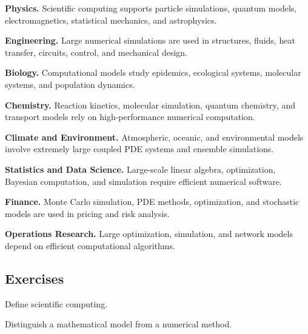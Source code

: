 \begin{applicationbox}

\textbf{Physics.}
Scientific computing supports particle simulations, quantum models,
electromagnetics, statistical mechanics, and astrophysics.

\medskip

\textbf{Engineering.}
Large numerical simulations are used in structures, fluids, heat transfer,
circuits, control, and mechanical design.

\medskip

\textbf{Biology.}
Computational models study epidemics, ecological systems, molecular
systems, and population dynamics.

\medskip

\textbf{Chemistry.}
Reaction kinetics, molecular simulation, quantum chemistry, and transport
models rely on high-performance numerical computation.

\medskip

\textbf{Climate and Environment.}
Atmospheric, oceanic, and environmental models involve extremely large
coupled PDE systems and ensemble simulations.

\medskip

\textbf{Statistics and Data Science.}
Large-scale linear algebra, optimization, Bayesian computation, and
simulation require efficient numerical software.

\medskip

\textbf{Finance.}
Monte Carlo simulation, PDE methods, optimization, and stochastic models
are used in pricing and risk analysis.

\medskip

\textbf{Operations Research.}
Large optimization, simulation, and network models depend on efficient
computational algorithms.

\end{applicationbox}

\subsection{Exercises}
\label{subsec:scientific-computing-exercises}

\begin{exercise}[1]
Define scientific computing.
\end{exercise}

\begin{exercise}[1]
Distinguish a mathematical model from a numerical method.
\end{exercise}

